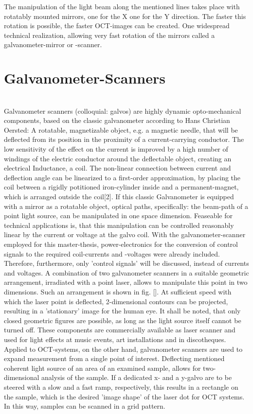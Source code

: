 The manipulation of the light beam along the mentioned lines takes place with rotatably mounted mirrors, one for the X one for the Y direction. The faster this rotation is possible, the faster OCT-images can be created. One widespread technical realization, allowing very fast rotation of the mirrors called a galvanometer-mirror or -scanner.

\section{Galvanometer-Scanners}
 \\
Galvanometer scanners (colloquial: galvos) are highly dynamic opto-mechanical components, based on the classic galvanometer according to Hans Christian Oersted: A rotatable, magnetizable object, e.g. a magnetic needle, that will be deflected from its position in the proximity of a current-carrying conductor. The low sensitivity of the effect on the current is improved by a high number of windings of the electric conductor around the deflectable object, creating an electrical Inductance, a coil. The non-linear connection between current and deflection angle can be linearized to a first-order approximation, by placing the coil between a rigidly potitioned iron-cylinder inside and a permanent-magnet, which is arranged outside the coil[2]. 
If this classic Galvanometer is equipped with a mirror as a rotatable object, optical paths, specifically: the beam-path of a point light source, can be manipulated in one space dimension. Feaseable for technical applications is, that this manipulation can be controlled reasonably linear by the current or voltage at the galvo coil. With the galvanometer-scanner employed for this master-thesis, power-electronics for the conversion of control signals to the required coil-currents and -voltages were already included. Therefore, furthermore, only 'control signals' will be discussed, instead of currents and voltages. A combination of two galvanometer scanners in a suitable geometric arrangement, irradiated with a point laser, allows to manipulate this point in two dimensions. Such an arrangement is shown in fig. []. At sufficient speed with which the laser point is deflected, 2-dimensional contours can be projected, resulting in a 'stationary' image for the human eye. It shall be noted, that only closed geometric figures are possible, as long as the light source itself cannot be turned off. These components are commercially available as laser scanner and used for light effects at music events, art installations and in discotheques. Applied to OCT-systems, on the other hand, galvanometer scanners are used to expand measurement from a single point of interest. Deflecting mentioned coherent light source of an area of an examined sample, allows for two-dimensional analysis of the sample. If a dedicated x- and a y-galvo are to be steered with a slow and a fast ramp, respectively, this results in a rectangle on the sample, which is the desired 'image shape' of the laser dot for OCT systems. In this way, samples can be scanned in a grid pattern.

